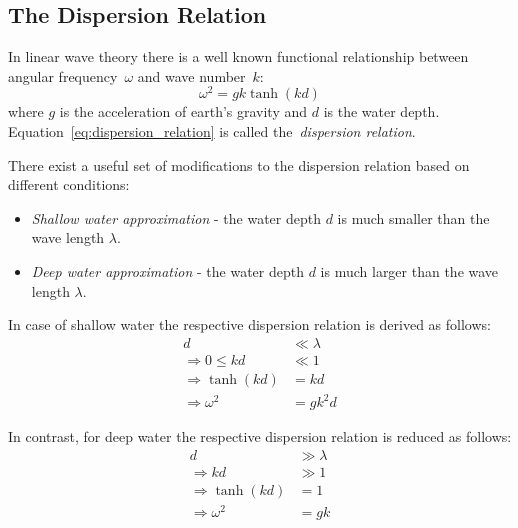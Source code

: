 \subsection{The Dispersion Relation}
\label{sec:dispersion_relation}

In linear wave theory there is a well known functional relationship between angular frequency~$\omega$
and wave number~$k$:
%
\begin{equation}
\label{eq:dispersion_relation}
 \omega^2 = gk\tanh(kd)
\end{equation}
%
where $g$ is the acceleration of earth's gravity and $d$ is the water depth. Equation~\ref{eq:dispersion_relation}
is called the~\emph{dispersion relation}.

There exist a useful set of modifications to the dispersion relation based on different conditions:
\begin{itemize}
 \item \emph{Shallow water approximation} - the water depth $d$ is much smaller than the wave length $\lambda$.
 \item \emph{Deep water approximation} - the water depth $d$ is much larger than the wave length $\lambda$.
\end{itemize}

In case of shallow water the respective dispersion relation is derived as follows:
\begin{align}
 d & \ll \lambda \\
 \Rightarrow 0 \leq kd & \ll 1 \\
 \Rightarrow \tanh(kd) & = kd \\
 \Rightarrow \omega^2 & = gk^2d
\end{align}

In contrast, for deep water the respective dispersion relation is reduced as follows:
\begin{align}
 d & \gg \lambda \\
 \Rightarrow kd & \gg 1 \\
 \Rightarrow \tanh(kd) & = 1 \\
 \Rightarrow \omega^2 & = gk
\end{align}

